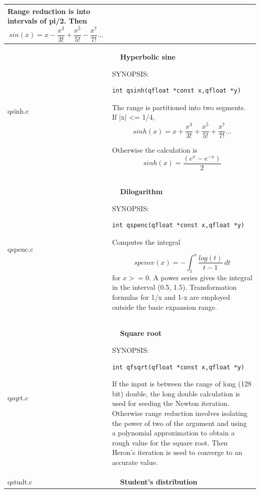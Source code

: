 \documentclass[10pt,a4paper,x11names]{memoir} %
\newcounter{entry}
\newcommand{\TOC}[1] {\addcontentsline{toc}{section}{\theentry\ \  #1} \textbf{\theentry\ \  #1} \par\stepcounter{entry}}
\begin{document}
\begin{longtable}{|p{1.5cm}|p{11.5cm}|}
	Range reduction is into intervals of pi/2.
	Then
	$$ sin(x) = x - \frac{x^3}{3!}+\frac{x^5}{5!}-\frac{x^7}{7!} ...$$
	\\\hline
	
	qsinh.c& \TOC{Hyperbolic sine}
	
	{\footnotesize SYNOPSIS:}\vspace{-0.2cm}\index{qsinh}
	\begin{lstlisting}[numbers=none]
		int qsinh(qfloat *const x,qfloat *y)
	\end{lstlisting}\vspace{-0.2cm}
	The range is partitioned into two segments.  If |x| <= 1/4,
	$$ sinh(x)=x+\frac{x^3}{3!}+\frac{x^5}{5!}+\frac{x^7}{7!} ...$$
	
	Otherwise the calculation is $$sinh(x) = \frac{( e^{x} - e^{-x} )}{2}$$
	
	\\\hline
	qspenc.c& \TOC{Dilogarithm}
	
	{\footnotesize SYNOPSIS:}\vspace{-0.2cm}\index{qspenc}
	\begin{lstlisting}[numbers=none]
		int qspenc(qfloat *const x,qfloat *y)
	\end{lstlisting}\vspace{-0.2cm}
	
	Computes the integral
	
	$$ spence(x)= - \int_{1}^{x} \frac{log(t)}{t-1} \ dt$$
	for $x >= 0$.  A power series gives the integral in
	the interval (0.5, 1.5).  Transformation formulas for 1/x
	and 1-x are employed outside the basic expansion range.
	\\\hline
	qsqrt.c& \TOC{Square root}
	
	{\footnotesize SYNOPSIS:}\vspace{-0.2cm}\index{qfsqrt}
	\begin{lstlisting}[numbers=none]
		int qfsqrt(qfloat *const x,qfloat *y)
	\end{lstlisting}\vspace{-0.2cm}
	
	If the input is between the range of long (128 bit)  double, the long double calculation is used for seeding
	the Newton iteration. Otherwise  range reduction involves isolating the power of two of the
	argument and using a polynomial approximation to obtain
	a rough value for the square root.  Then Heron's iteration
	is used to converge to an accurate value.
	\\\hline
	qstudt.c& \TOC{Student's distribution}
	

\end{longtable}
\end{document}
